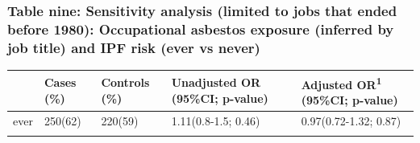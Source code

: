 \documentclass[
]{article}
\begin{document}
\hypertarget{table-nine-sensitivity-analysis-limited-to-jobs-that-ended-before-1980-occupational-asbestos-exposure-inferred-by-job-title-and-ipf-risk-ever-vs-never}{%
\subsubsection{Table nine: Sensitivity analysis (limited to jobs that
ended before 1980): Occupational asbestos exposure (inferred by job
title) and IPF risk (ever vs
never)}\label{table-nine-sensitivity-analysis-limited-to-jobs-that-ended-before-1980-occupational-asbestos-exposure-inferred-by-job-title-and-ipf-risk-ever-vs-never}}

\begin{longtable}[]{@{}lllll@{}}
\toprule
\begin{minipage}[b]{0.06\columnwidth}\raggedright
\strut
\end{minipage} & \begin{minipage}[b]{0.10\columnwidth}\raggedright
Cases (\%)\strut
\end{minipage} & \begin{minipage}[b]{0.12\columnwidth}\raggedright
Controls (\%)\strut
\end{minipage} & \begin{minipage}[b]{0.29\columnwidth}\raggedright
Unadjusted OR (95\%CI; p-value)\strut
\end{minipage} & \begin{minipage}[b]{0.28\columnwidth}\raggedright
Adjusted OR\textsuperscript{1} (95\%CI; p-value)\strut
\end{minipage}\tabularnewline
\midrule
\endhead
\begin{minipage}[t]{0.06\columnwidth}\raggedright
ever\strut
\end{minipage} & \begin{minipage}[t]{0.10\columnwidth}\raggedright
250(62)\strut
\end{minipage} & \begin{minipage}[t]{0.12\columnwidth}\raggedright
220(59)\strut
\end{minipage} & \begin{minipage}[t]{0.29\columnwidth}\raggedright
1.11(0.8-1.5; 0.46)\strut
\end{minipage} & \begin{minipage}[t]{0.28\columnwidth}\raggedright
0.97(0.72-1.32; 0.87)\strut
\end{minipage}\tabularnewline
\begin{minipage}[t]{0.06\columnwidth}\raggedright

\end{minipage}
\end{longtable}
\end{document}
